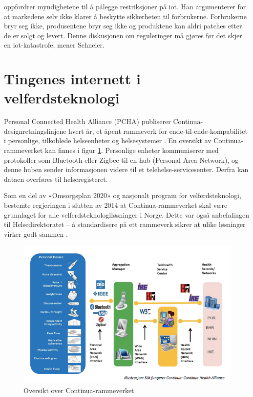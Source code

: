\citet{iot_schneier_regulation} oppfordrer myndighetene til å pålegge restriksjoner på \gls{iot}.
Han argumenterer for at markedene selv ikke klarer å beskytte sikkerheten til forbrukerne.
Forbrukerne bryr seg ikke, produsentene bryr seg ikke og produktene kan aldri patches
etter de er solgt og levert. Denne diskusjonen om reguleringer må gjøres før det skjer
en \gls{iot}-katastrofe, mener Schneier. %


\section{Tingenes internett i velferdsteknologi}
Personal Connected Health Alliance (PCHA) publiserer Continua-designretningslinjene hvert år,
et åpent rammeverk for ende-til-ende-kompabilitet i personlige, tilkoblede helseenheter og helsesystemer \citep{continua_guidelines}.
En oversikt av Continua-rammeverket kan finnes i figur \ref{fig:continua}. Personlige enheter kommuniserer med
protokoller som Bluetooth eller Zigbee til en hub (Personal Area Network), og denne huben sender informasjonen
videre til et telehelse-servicesenter. Derfra kan dataen overføres til helseregisteret.

Som en del av «Omsorgsplan 2020» og nasjonalt program for velferdsteknologi, bestemte regjeringen
i slutten av 2014 at Continua-rammeverket skal være grunnlaget for alle velferdsteknologiløsninger i Norge.
Dette var også anbefalingen til Helsedirektoratet --
å standardisere på ett rammeverk sikrer at ulike løsninger virker godt sammen \citep{regjeringen_continua}.

\begin{figure}
\includegraphics[width=1.0\textwidth,center]{fig/continua}
\caption{Oversikt over Continua-rammeverket}
\label{fig:continua}
\end{figure}
